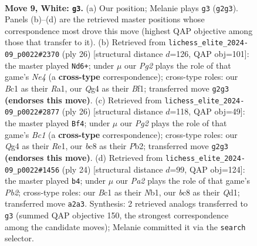 \documentclass[11pt]{article}
\begin{document}
\clearpage

\begin{figure}[p]\centering
\begin{subfigure}{0.46\textwidth}\centering
\resizebox{\linewidth}{!}{%
\newchessgame
\chessboard[
  setfen={r1bq1b1r/pp1nkppp/2n1p3/3pP3/3P2Q1/3B4/PP1N1PPP/R1B1K1NR w KQ - 1 9},
  showmover=false,
  pgfstyle=straightmove, color=movearrow, markmove={g2-g3}
]}
\caption{}
\end{subfigure}\hfill
\begin{subfigure}{0.46\textwidth}\centering
\resizebox{\linewidth}{!}{%
\newchessgame
\chessboard[
  setfen={r2qk2r/bp1b1ppp/p1n1p3/3nP2P/3pNPP1/P7/1PP2B2/R2QKBNR w KQkq - 3 14},
  showmover=false,
  pgfstyle=straightmove, color=movearrow, markmove={e4-d6}
]}
\caption{}
\end{subfigure}
\\[4pt]
\begin{subfigure}{0.46\textwidth}\centering
\resizebox{\linewidth}{!}{%
\newchessgame
\chessboard[
  setfen={2r1kb1r/1pqb1ppp/4pn2/p2p4/3P4/P1N2Q2/1PB2PPP/R1B1R1K1 w k - 1 14},
  showmover=false,
  pgfstyle=straightmove, color=movearrow, markmove={c1-f4}
]}
\caption{}
\end{subfigure}\hfill
\begin{subfigure}{0.46\textwidth}\centering
\resizebox{\linewidth}{!}{%
\newchessgame
\chessboard[
  setfen={r1b1kb1r/1p1nqp2/2pp2pp/p1n5/P1BNPB2/2P5/1P3PPP/RN1QR1K1 w kq - 2 13},
  showmover=false,
  pgfstyle=straightmove, color=movearrow, markmove={b2-b4}
]}
\caption{}
\end{subfigure}
\caption{\textbf{Move 9, White: \texttt{g3}.} (a) Our position; Melanie plays \texttt{g3} (\texttt{g2g3}). Panels (b)--(d) are the retrieved master positions whose correspondence most drove this move (highest QAP objective among those that transfer to it). (b) Retrieved from \texttt{lichess\_elite\_2024-09\_p0022\#2370} (ply 26) [structural distance $d$=126, QAP obj=101]: the master played \texttt{Nd6+}; under $\mu$ our \emph{Pg2} plays the role of that game's \emph{Ne4} (a \textbf{cross-type} correspondence); cross-type roles: our \emph{B}c1 as their \emph{R}a1, our \emph{Q}g4 as their \emph{B}f1; transferred move \texttt{g2g3} \textbf{(endorses this move)}. (c) Retrieved from \texttt{lichess\_elite\_2024-09\_p0022\#2877} (ply 26) [structural distance $d$=118, QAP obj=49]: the master played \texttt{Bf4}; under $\mu$ our \emph{Pg2} plays the role of that game's \emph{Bc1} (a \textbf{cross-type} correspondence); cross-type roles: our \emph{Q}g4 as their \emph{R}e1, our \emph{b}c8 as their \emph{P}b2; transferred move \texttt{g2g3} \textbf{(endorses this move)}. (d) Retrieved from \texttt{lichess\_elite\_2024-09\_p0022\#1456} (ply 24) [structural distance $d$=99, QAP obj=124]: the master played \texttt{b4}; under $\mu$ our \emph{Pa2} plays the role of that game's \emph{Pb2}; cross-type roles: our \emph{B}c1 as their \emph{N}b1, our \emph{b}c8 as their \emph{Q}d1; transferred move \texttt{a2a3}. Synthesis: 2 retrieved analogs transferred to \texttt{g3} (summed QAP objective 150, the strongest correspondence among the candidate moves); Melanie committed it via the \texttt{search} selector.}
\label{fig:thought-m16}
\end{figure}
\end{document}
